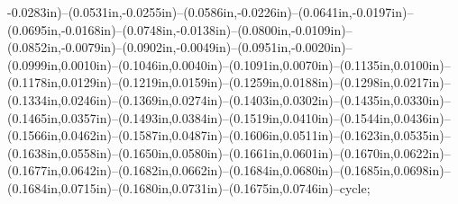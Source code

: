 -0.0283in)--(0.0531in,-0.0255in)--(0.0586in,-0.0226in)--(0.0641in,-0.0197in)--(0.0695in,-0.0168in)--(0.0748in,-0.0138in)--(0.0800in,-0.0109in)--(0.0852in,-0.0079in)--(0.0902in,-0.0049in)--(0.0951in,-0.0020in)--(0.0999in,0.0010in)--(0.1046in,0.0040in)--(0.1091in,0.0070in)--(0.1135in,0.0100in)--(0.1178in,0.0129in)--(0.1219in,0.0159in)--(0.1259in,0.0188in)--(0.1298in,0.0217in)--(0.1334in,0.0246in)--(0.1369in,0.0274in)--(0.1403in,0.0302in)--(0.1435in,0.0330in)--(0.1465in,0.0357in)--(0.1493in,0.0384in)--(0.1519in,0.0410in)--(0.1544in,0.0436in)--(0.1566in,0.0462in)--(0.1587in,0.0487in)--(0.1606in,0.0511in)--(0.1623in,0.0535in)--(0.1638in,0.0558in)--(0.1650in,0.0580in)--(0.1661in,0.0601in)--(0.1670in,0.0622in)--(0.1677in,0.0642in)--(0.1682in,0.0662in)--(0.1684in,0.0680in)--(0.1685in,0.0698in)--(0.1684in,0.0715in)--(0.1680in,0.0731in)--(0.1675in,0.0746in)--cycle;
